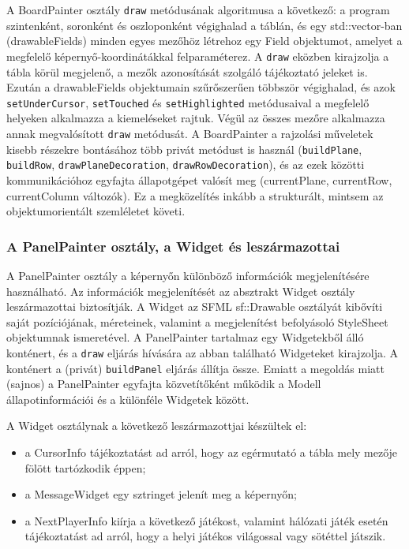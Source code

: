 \documentclass[12pt, twoside]{report}
\begin{document}
A BoardPainter osztály {\tt draw} metódusának algoritmusa a következő: a program szintenként, soronként és oszloponként végighalad a táblán, és egy std::vector-ban (drawableFields) minden egyes mezőhöz létrehoz egy Field objektumot, amelyet a megfelelő képernyő-koordinátákkal felparaméterez. A {\tt draw} eközben kirajzolja a tábla körül megjelenő, a mezők azonosítását szolgáló tájékoztató jeleket is. Ezután a drawableFields objektumain szűrőszerűen többször végighalad, és azok {\tt setUnderCursor}, {\tt setTouched} és {\tt setHighlighted} metódusaival a megfelelő helyeken alkalmazza a kiemeléseket rajtuk. Végül az összes mezőre alkalmazza annak megvalósított {\tt draw} metódusát. A BoardPainter a rajzolási műveletek kisebb részekre bontásához több privát metódust is használ ({\tt buildPlane}, {\tt buildRow}, {\tt drawPlaneDecoration}, {\tt drawRowDecoration}), és az ezek közötti kommunikációhoz egyfajta állapotgépet valósít meg (currentPlane, currentRow, currentColumn változók). Ez a megközelítés inkább a strukturált, mintsem az objektumorientált szemléletet követi.

\subsubsection{A PanelPainter osztály, a Widget és leszármazottai}

A PanelPainter osztály a képernyőn különböző információk megjelenítésére használható. Az információk megjelenítését az absztrakt Widget osztály leszármazottai biztosítják. A Widget az SFML sf::Drawable osztályát kibővíti saját pozíciójának, méreteinek, valamint a megjelenítést befolyásoló StyleSheet objektumnak ismeretével. A PanelPainter tartalmaz egy Widgetekből álló konténert, és a {\tt draw} eljárás hívására az abban található Widgeteket kirajzolja. A konténert a (privát) {\tt buildPanel} eljárás állítja össze. Emiatt a megoldás miatt (sajnos) a PanelPainter egyfajta közvetítőként működik a Modell állapotinformációi és a különféle Widgetek között.

A Widget osztálynak a következő leszármazottjai készültek el:
\begin{itemize}
	\item a CursorInfo tájékoztatást ad arról, hogy az egérmutató a tábla mely mezője fölött tartózkodik éppen;
	\item a MessageWidget egy sztringet jelenít meg a képernyőn;
	\item a NextPlayerInfo kiírja a következő játékost, valamint hálózati játék esetén tájékoztatást ad arról, hogy a helyi játékos világossal vagy sötéttel játszik.
\end{itemize}
\end{document}
